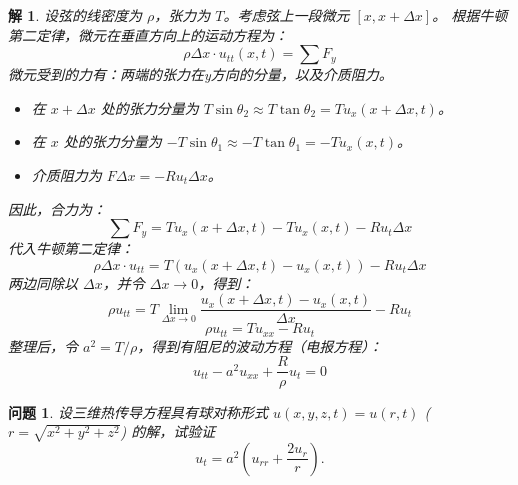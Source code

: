 \documentclass[12pt,a4paper]{article}
\newtheorem{problem}{问题}
\newtheorem*{solution}{解}
\begin{document}
	\begin{solution}
		设弦的线密度为 \(\rho\)，张力为 \(T\)。考虑弦上一段微元 \([x, x+\Delta x]\)。
		根据牛顿第二定律，微元在垂直方向上的运动方程为：
		\[
		\rho \Delta x \cdot u_{tt}(x, t) = \sum F_y
		\]
		微元受到的力有：两端的张力在y方向的分量，以及介质阻力。
		\begin{itemize}
			\item 在 \(x+\Delta x\) 处的张力分量为 \(T \sin\theta_2 \approx T \tan\theta_2 = T u_x(x+\Delta x, t)\)。
			\item 在 \(x\) 处的张力分量为 \(-T \sin\theta_1 \approx -T \tan\theta_1 = -T u_x(x, t)\)。
			\item 介质阻力为 \(F \Delta x = -Ru_t \Delta x\)。
		\end{itemize}
		因此，合力为：
		\[
		\sum F_y = T u_x(x+\Delta x, t) - T u_x(x, t) - Ru_t \Delta x
		\]
		代入牛顿第二定律：
		\[
		\rho \Delta x \cdot u_{tt} = T(u_x(x+\Delta x, t) - u_x(x, t)) - Ru_t \Delta x
		\]
		两边同除以 \(\Delta x\)，并令 \(\Delta x \to 0\)，得到：
		\[
		\rho u_{tt} = T \lim_{\Delta x \to 0} \frac{u_x(x+\Delta x, t) - u_x(x, t)}{\Delta x} - Ru_t
		\]
		\[
		\rho u_{tt} = T u_{xx} - Ru_t
		\]
		整理后，令 \(a^2 = T/\rho\)，得到有阻尼的波动方程（电报方程）：
		\[
		u_{tt} - a^2 u_{xx} + \frac{R}{\rho} u_t = 0
		\]
	\end{solution}
	
	
	\newpage
	\begin{problem}
		设三维热传导方程具有球对称形式 \(u(x,y,z,t) = u(r,t)\) (\(r=\sqrt{x^2+y^2+z^2}\)) 的解，试验证
		\[ u_t = a^2 \left( u_{rr} + \frac{2u_r}{r} \right). \]
	\end{problem}
	
\end{document}
